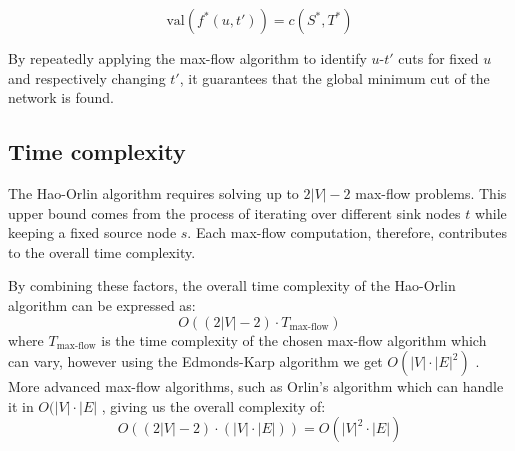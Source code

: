 \[
\text{val}(f^*(u, t')) = c(S^*, T^*)
\]

By repeatedly applying the max-flow algorithm to identify \( u \)-\( t' \) cuts for fixed \(u\) and respectively changing \(t'\), it guarantees that the global minimum cut of the network is found.


\subsection{Time complexity}

The Hao-Orlin algorithm requires solving up to \( 2|V| - 2 \) max-flow problems. This upper bound comes from the process of iterating over different sink nodes \( t \) while keeping a fixed source node \( s \). Each max-flow computation, therefore, contributes to the overall time complexity.

By combining these factors, the overall time complexity of the Hao-Orlin algorithm can be expressed as:
\[
O((2|V| - 2) \cdot T_{\text{max-flow}})
\]
where \( T_{\text{max-flow}} \) is the time complexity of the chosen max-flow algorithm which can vary, however using the Edmonds-Karp algorithm we get \( O(|V| \cdot |E|^2) \) \cite{edmonds1972theoretical}. More advanced max-flow algorithms, such as Orlin's algorithm which can handle it in \( O(|V| \cdot |E| \) \cite{orlin2013max}, giving us the overall complexity of:
\[
O((2|V| - 2) \cdot (|V| \cdot |E|)) = O(|V|^2 \cdot |E|)
\]

